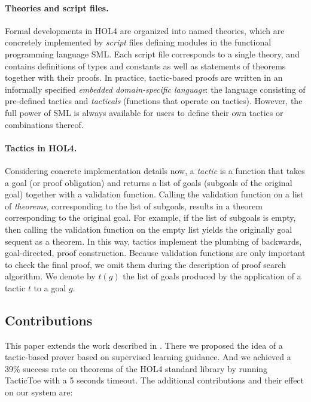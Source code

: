 \documentclass[runningheads,a4paper,draft]{svjour3}
\def\holfour{\textsf{HOL4}\xspace}
\def\sml{\textsf{SML}\xspace}
\def\tactictoe{\textsf{TacticToe}\xspace}
\begin{document}
\paragraph{Theories and script files.}
Formal developments in \holfour are organized into named theories, which are
concretely implemented by \emph{script} files defining modules in the
functional programming language \sml.
Each script file corresponds to a single theory, and contains definitions of
types and constants as well as statements of theorems together with their
proofs.
In practice, tactic-based proofs are written in an informally specified
\emph{embedded domain-specific language}: the language consisting of
pre-defined tactics and \emph{tacticals} (functions that operate on tactics).
However, the full power of \sml is always available for users to define their
own tactics or combinations thereof.

\paragraph{Tactics in \holfour.}
Considering concrete implementation details now, a \emph{tactic} is a function
that takes a goal (or proof obligation) and returns a list of goals (subgoals
of the original goal) together
with a validation function.
Calling the validation function on a list of \emph{theorems}, corresponding to
the list of subgoals, results in a theorem corresponding to the original goal.
For example, if the list of subgoals is empty, then calling the validation
function on the empty list yields the originally goal sequent as a theorem.
In this way, tactics implement the plumbing of backwards, goal-directed, proof
construction.
Because validation functions are only important to check the final proof, we
omit them during the description of proof search algorithm. We denote by $t(g)$
the list of goals produced by the application of a tactic $t$ to a goal $g$.

\subsection{Contributions}
This paper extends the work described in \cite{tgckju-lpar17}.
There we proposed the idea of a tactic-based prover based on supervised
learning guidance. And we achieved a 39\% success rate on theorems of the
\holfour standard library by running \tactictoe with a 5 seconds timeout.
The additional contributions and their effect on our system are:
\end{document}
